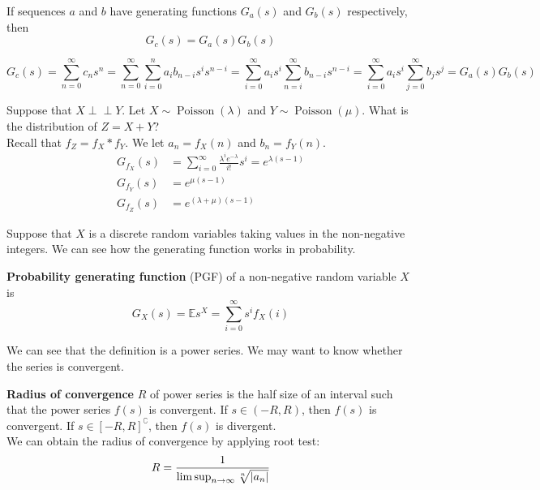 \documentclass{huhtakm-template-book}
\newcommand{\independent}{\perp\!\!\!\perp}
\newcommand{\expect}{\mathbb{E}}
\DeclareMathOperator{\Poisson}{Poisson}
\begin{document}
\newpage
\begin{lem}
	If sequences $a$ and $b$ have generating functions $G_{a}(s)$ and $G_{b}(s)$ respectively, then
	\begin{equation*}
		G_{c}(s)=G_{a}(s)G_{b}(s)
	\end{equation*}
\end{lem}
\begin{proofing}
	\begin{equation*}
		G_{c}(s)=\sum_{n=0}^{\infty}c_{n}s^{n}=\sum_{n=0}^{\infty}\sum_{i=0}^{n}a_{i}b_{n-i}s^{i}s^{n-i}=\sum_{i=0}^{\infty}a_{i}s^{i}\sum_{n=i}^{\infty}b_{n-i}s^{n-i}=\sum_{i=0}^{\infty}a_{i}s^{i}\sum_{j=0}^{\infty}b_{j}s^{j}=G_{a}(s)G_{b}(s)
	\end{equation*}
\end{proofing}
\begin{eg}
	\label{Chapter 6 (Example) Two independent poisson PGF}
	Suppose that $X\independent Y$. Let $X\sim\Poisson(\lambda)$ and $Y\sim\Poisson(\mu)$. What is the distribution of $Z=X+Y$?\\
	Recall that $f_{Z}=f_{X}*f_{Y}$. We let $a_{n}=f_{X}(n)$ and $b_{n}=f_{Y}(n)$.
	\begin{align*}
		G_{f_{X}}(s)&=\sum_{i=0}^{\infty}\frac{\lambda^{i}e^{-\lambda}}{i!}s^{i}=e^{\lambda(s-1)}\\
		G_{f_{Y}}(s)&=e^{\mu(s-1)}\\
		G_{f_{Z}}(s)&=e^{(\lambda+\mu)(s-1)}
	\end{align*}
\end{eg}
Suppose that $X$ is a discrete random variables taking values in the non-negative integers. We can see how the generating function works in probability.
\begin{defn}
	\textbf{Probability generating function} (PGF) of a non-negative random variable $X$ is
	\begin{equation*}
		G_{X}(s)=\expect s^{X}=\sum_{i=0}^{\infty}s^{i}f_{X}(i)
	\end{equation*}
\end{defn}
We can see that the definition is a power series. We may want to know whether the series is convergent.
\begin{defn}
	\textbf{Radius of convergence} $R$ of power series is the half size of an interval such that the power series $f(s)$ is convergent. If $s\in(-R,R)$, then $f(s)$ is convergent. If $s\in[-R,R]^{\complement}$, then $f(s)$ is divergent.\\
	We can obtain the radius of convergence by applying root test:
	\begin{equation*}
		R=\frac{1}{\limsup_{n\to\infty}\sqrt[n]{\left|{a_{n}}\right|}}
	\end{equation*}
\end{defn}
\end{document}
